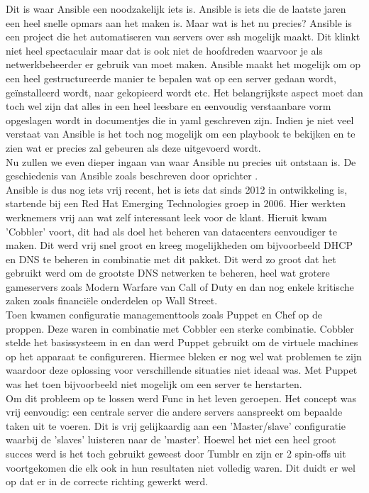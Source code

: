 Dit is waar Ansible een noodzakelijk iets is. Ansible is iets die de laatste jaren een heel snelle opmars aan het maken is. Maar wat is het nu precies? Ansible is een project die het automatiseren van servers over ssh mogelijk maakt. Dit klinkt niet heel spectaculair maar dat is ook niet de hoofdreden waarvoor je als netwerkbeheerder er gebruik van moet maken. Ansible maakt het mogelijk om op een heel gestructureerde manier te bepalen wat op een server gedaan wordt, geïnstalleerd wordt, naar gekopieerd wordt etc. Het belangrijkste aspect moet dan toch wel zijn dat alles in een heel leesbare en eenvoudig verstaanbare vorm opgeslagen wordt in documentjes die in yaml geschreven zijn. Indien je niet veel verstaat van Ansible is het toch nog mogelijk om een playbook te bekijken en te zien wat er precies zal gebeuren als deze uitgevoerd wordt.
\\

Nu zullen we even dieper ingaan van waar Ansible nu precies uit ontstaan is. De geschiedenis van Ansible zoals beschreven door oprichter \textcite{historyAnsible}.
\\

Ansible is dus nog iets vrij recent, het is iets dat sinds 2012 in ontwikkeling is, startende bij een Red Hat Emerging Technologies groep in 2006. Hier werkten werknemers vrij aan wat zelf interessant leek voor de klant. Hieruit kwam 'Cobbler' voort, dit had als doel het beheren van datacenters eenvoudiger te maken.  Dit werd vrij snel groot en kreeg mogelijkheden om bijvoorbeeld DHCP en DNS te beheren in combinatie met dit pakket. Dit werd zo groot dat het gebruikt werd om de grootste DNS netwerken te beheren, heel wat grotere gameservers zoals Modern Warfare van Call of Duty en dan nog enkele kritische zaken zoals financiële onderdelen op Wall Street. 
\\

Toen kwamen configuratie managementtools zoals Puppet en Chef op de proppen. Deze waren in combinatie met Cobbler een sterke combinatie. Cobbler stelde het basissysteem in en dan werd Puppet gebruikt om de virtuele machines op het apparaat te configureren. Hiermee bleken er nog wel wat problemen te zijn waardoor deze oplossing voor verschillende situaties niet ideaal was. Met Puppet was het toen bijvoorbeeld niet mogelijk om een server te herstarten.
\\

Om dit probleem op te lossen werd Func in het leven geroepen. Het concept was vrij eenvoudig: een centrale server die andere servers aanspreekt om bepaalde taken uit te voeren. Dit is vrij gelijkaardig aan een 'Master/slave' configuratie waarbij de 'slaves' luisteren naar de 'master'. Hoewel het niet een heel groot succes werd is het toch gebruikt geweest door Tumblr en zijn er 2 spin-offs uit voortgekomen die elk ook in hun resultaten niet volledig waren. Dit duidt er wel op dat er in de correcte richting gewerkt werd.
\\

